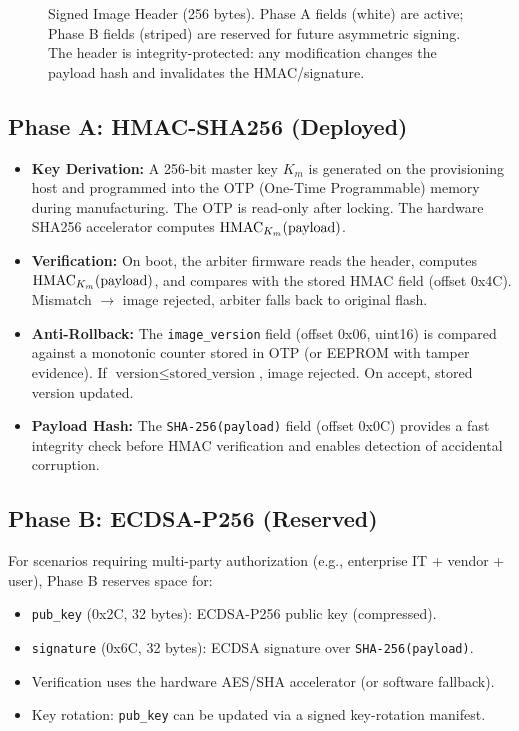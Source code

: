 \begin{figure}[t]
\begin{tikzpicture}
\end{tikzpicture}
\caption{Signed Image Header (256 bytes). Phase A fields (white) are active; Phase B fields (striped) are reserved for future asymmetric signing. The header is integrity-protected: any modification changes the payload hash and invalidates the HMAC/signature.}
\label{fig:signed_header}
\end{figure}

\subsection{Phase A: HMAC-SHA256 (Deployed)}
\begin{itemize}
    \item \textbf{Key Derivation:} A 256-bit master key $K_m$ is generated on the provisioning host and programmed into the \rp \ac{OTP} (One-Time Programmable) memory during manufacturing. The \ac{OTP} is read-only after locking. The \rp hardware \ac{SHA}256 accelerator computes $\operatorname{HMAC}_{K_m}(\text{payload})$.
    \item \textbf{Verification:} On boot, the arbiter firmware reads the header, computes $\operatorname{HMAC}_{K_m}(\text{payload})$, and compares with the stored HMAC field (offset 0x4C). Mismatch $\to$ image rejected, arbiter falls back to original flash.
    \item \textbf{Anti-Rollback:} The \texttt{image\_version} field (offset 0x06, uint16) is compared against a monotonic counter stored in \rp \ac{OTP} (or \ac{EEPROM} with tamper evidence). If $\text{version} \le \text{stored\_version}$, image rejected. On accept, stored version updated.
    \item \textbf{Payload Hash:} The \texttt{SHA-256(payload)} field (offset 0x0C) provides a fast integrity check before HMAC verification and enables detection of accidental corruption.
\end{itemize}

\subsection{Phase B: ECDSA-P256 (Reserved)}
For scenarios requiring multi-party authorization (e.g., enterprise IT + vendor + user), Phase B reserves space for:
\begin{itemize}
    \item \texttt{pub\_key} (0x2C, 32 bytes): ECDSA-P256 public key (compressed).
    \item \texttt{signature} (0x6C, 32 bytes): ECDSA signature over \texttt{SHA-256(payload)}.
    \item Verification uses the \rp hardware \ac{AES}/SHA accelerator (or software fallback).
    \item Key rotation: \texttt{pub\_key} can be updated via a signed key-rotation manifest.
\end{itemize}


